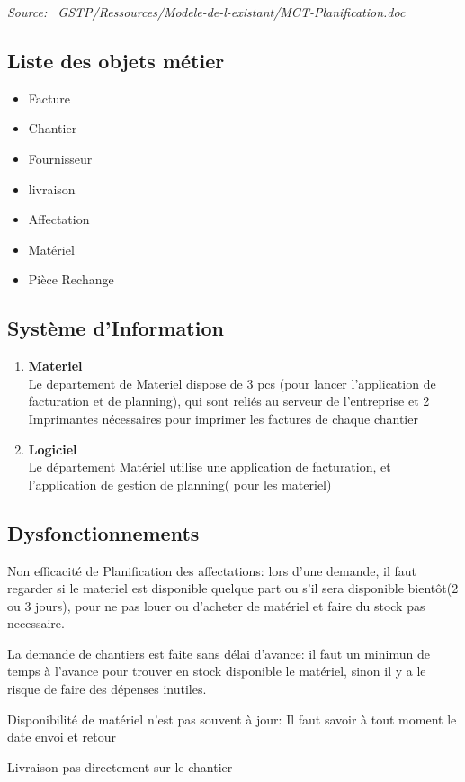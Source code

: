     {\sl Source:~{\ttfamily 
        GSTP/Ressources/Modele-de-l-existant/MCT-Planification.doc}}


\subsection{Liste des objets métier}

    \begin{itemize}
    	\item Facture
    	\item Chantier
    	\item Fournisseur
    	\item livraison
    	\item Affectation
    	\item Matériel
    	\item Pièce Rechange
    \end{itemize}


\subsection{Système d'Information}
\begin{enumerate}

\item  \textbf{Materiel}\\

Le departement de Materiel dispose de 3 pcs (pour lancer l'application de facturation et de planning), qui sont reliés au serveur de l'entreprise et 2 Imprimantes nécessaires pour imprimer les factures de chaque chantier\\

\item  \textbf{Logiciel}\\

Le département Matériel utilise une application de facturation, et l'application de gestion de planning( pour les materiel)\\
\end{enumerate}

\subsection{Dysfonctionnements}


Non efficacité de Planification des affectations: lors d'une demande, il faut regarder si le materiel est disponible quelque part ou s'il sera disponible bientôt(2 ou 3 jours), pour ne pas louer ou d'acheter de matériel et faire du stock pas necessaire.

La demande de chantiers est faite sans délai d'avance: il faut un minimun de temps à l'avance pour trouver en stock disponible le matériel, sinon il y a le risque de faire des dépenses inutiles.

Disponibilité de matériel n'est pas souvent à jour: Il faut savoir à tout moment le date envoi et retour

Livraison pas directement sur le chantier
